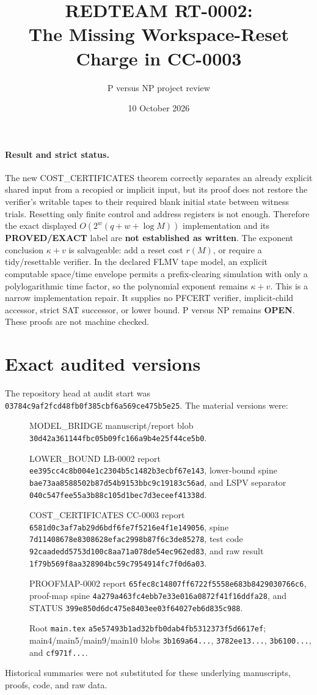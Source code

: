 \documentclass[11pt]{article}
\title{REDTEAM RT-0002:\\The Missing Workspace-Reset Charge in CC-0003}
\author{P versus NP project review}
\date{10 October 2026}
\begin{document}
\maketitle

\paragraph{Result and strict status.}
The new COST\_CERTIFICATES theorem correctly separates an already explicit
shared input from a recopied or implicit input, but its proof does not restore
the verifier's writable tapes to their required blank initial state between
witness trials.  Resetting only finite control and address registers is not
enough.  Therefore the exact displayed $O(2^w(q+w+\log M))$ implementation
and its \textbf{PROVED/EXACT} label are \textbf{not established as written}.
The exponent conclusion $\kappa+v$ is salvageable: add a reset cost $r(M)$,
or require a tidy/resettable verifier.  In the declared FLMV tape model, an
explicit computable space/time envelope permits a prefix-clearing simulation
with only a polylogarithmic time factor, so the polynomial exponent remains
$\kappa+v$.  This is a narrow implementation repair.  It supplies no PFCERT
verifier, implicit-child accessor, strict SAT successor, or lower bound.
P versus NP remains \textbf{OPEN}.  These proofs are not machine checked.

\section{Exact audited versions}
The repository head at audit start was
\texttt{03784c9af2fcd48fb0f385cbf6a569ce475b5e25}.  The material versions were:
\begin{description}
\item[] MODEL\_BRIDGE manuscript/report blob
\texttt{30d42a361144fbc05b09fc166a9b4e25f44ce5b0}.
\item[] LOWER\_BOUND LB-0002 report
\texttt{ee395cc4c8b004e1c2304b5c1482b3ecbf67e143}, lower-bound spine
\texttt{bae73aa8588502b87d54b9153bbc9c19183c56ad}, and LSPV separator
\texttt{040c547fee55a3b88c105d1bec7d3eceef41338d}.
\item[] COST\_CERTIFICATES CC-0003 report
\texttt{6581d0c3af7ab29d6bdf6fe7f5216e4f1e149056}, spine
\texttt{7d11408678e8308628efac2998b87f6c3de85278}, test code
\texttt{92caadedd5753d100c8aa71a078de54ec962ed83}, and raw result
\texttt{1f79b569f8aa328904bc59c7954914fc7f0d6a03}.
\item[] PROOFMAP-0002 report
\texttt{65fec8c14807ff6722f5558e683b8429030766c6}, proof-map spine
\texttt{4a279a463fc4ebb7e33e016a0872f41f16ddfa28}, and STATUS
\texttt{399e850d6dc475e8403ee03f64027eb6d835c988}.
\item[] Root \texttt{main.tex}
\texttt{a5e57493b1ad32bfb0dab4fb5312373f5d6617ef}; main4/main5/main9/main10
blobs \texttt{3b169a64...}, \texttt{3782ee13...}, \texttt{3b6100...}, and
\texttt{cf971f...}.
\end{description}
Historical summaries were not substituted for these underlying manuscripts,
proofs, code, and raw data.
\end{document}
